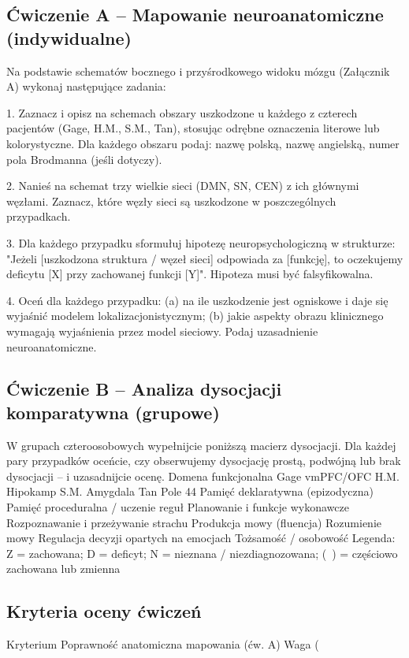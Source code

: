 \documentclass[11pt,a4paper]{article}
\begin{document}
\subsection{Ćwiczenie A – Mapowanie neuroanatomiczne (indywidualne)}

Na podstawie schematów bocznego i przyśrodkowego widoku mózgu (Załącznik A) wykonaj następujące
zadania:

1. Zaznacz i opisz na schemach obszary uszkodzone u każdego z czterech pacjentów (Gage, H.M., S.M.,
Tan), stosując odrębne oznaczenia literowe lub kolorystyczne. Dla każdego obszaru podaj: nazwę
polską, nazwę angielską, numer pola Brodmanna (jeśli dotyczy).

2. Nanieś na schemat trzy wielkie sieci (DMN, SN, CEN) z ich głównymi węzłami. Zaznacz, które węzły
sieci są uszkodzone w poszczególnych przypadkach.

3. Dla każdego przypadku sformułuj hipotezę neuropsychologiczną w strukturze: "Jeżeli [uszkodzona
struktura / węzeł sieci] odpowiada za [funkcję], to oczekujemy deficytu [X] przy zachowanej funkcji
[Y]". Hipoteza musi być falsyfikowalna.

4. Oceń dla każdego przypadku: (a) na ile uszkodzenie jest ogniskowe i daje się wyjaśnić modelem
lokalizacjonistycznym; (b) jakie aspekty obrazu klinicznego wymagają wyjaśnienia przez model
sieciowy. Podaj uzasadnienie neuroanatomiczne.


\subsection{Ćwiczenie B – Analiza dysocjacji komparatywna (grupowe)}
W grupach czteroosobowych wypełnijcie poniższą macierz dysocjacji. Dla każdej pary przypadków oceńcie, czy obserwujemy dysocjację prostą, podwójną lub brak dysocjacji – i uzasadnijcie ocenę.
Domena funkcjonalna
Gage vmPFC/OFC
H.M. Hipokamp
S.M. Amygdala
Tan Pole 44
Pamięć deklaratywna (epizodyczna)
Pamięć proceduralna / uczenie reguł
Planowanie i funkcje wykonawcze
Rozpoznawanie i przeżywanie strachu
Produkcja mowy (fluencja)
Rozumienie mowy
Regulacja decyzji opartych na emocjach
Tożsamość / osobowość
Legenda: Z = zachowana; D = deficyt; N = nieznana / niezdiagnozowana; (~) = częściowo zachowana lub zmienna

\subsection{Kryteria oceny ćwiczeń}
Kryterium
Poprawność anatomiczna
mapowania (ćw. A)
Waga (%
\end{document}
